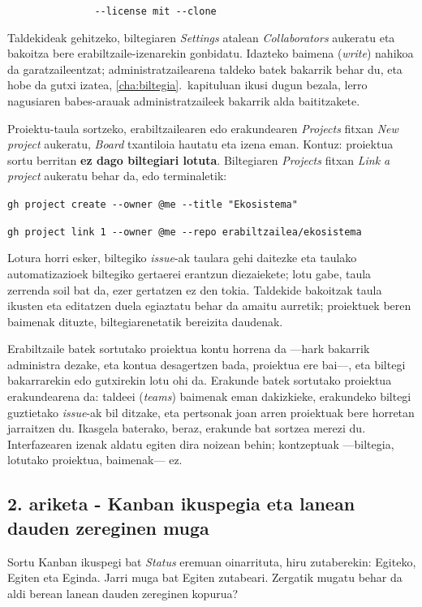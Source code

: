 \verb|               --license mit --clone|

Taldekideak gehitzeko, biltegiaren \textit{Settings} atalean \textit{Collaborators} aukeratu eta bakoitza bere erabiltzaile-izenarekin gonbidatu.
Idazteko baimena (\textit{write}) nahikoa da garatzaileentzat; administratzailearena taldeko batek bakarrik behar du, eta hobe da gutxi izatea, \ref{cha:biltegia}.~kapituluan ikusi dugun bezala, lerro nagusiaren babes-arauak administratzaileek bakarrik alda baititzakete.

Proiektu-taula sortzeko, erabiltzailearen edo erakundearen \textit{Projects} fitxan \textit{New project} aukeratu, \textit{Board} txantiloia hautatu eta izena eman.
Kontuz: proiektua sortu berritan \textbf{ez dago biltegiari lotuta}.
Biltegiaren \textit{Projects} fitxan \textit{Link a project} aukeratu behar da, edo terminaletik:

\verb|gh project create --owner @me --title "Ekosistema"|

\verb|gh project link 1 --owner @me --repo erabiltzailea/ekosistema|

Lotura horri esker, biltegiko \textit{issue}-ak taulara gehi daitezke eta taulako automatizazioek biltegiko gertaerei erantzun diezaiekete; lotu gabe, taula zerrenda soil bat da, ezer gertatzen ez den tokia.
Taldekide bakoitzak taula ikusten eta editatzen duela egiaztatu behar da amaitu aurretik; proiektuek beren baimenak dituzte, biltegiarenetatik bereizita daudenak.

Erabiltzaile batek sortutako proiektua kontu horrena da ---hark bakarrik administra dezake, eta kontua desagertzen bada, proiektua ere bai---, eta biltegi bakarrarekin edo gutxirekin lotu ohi da.
Erakunde batek sortutako proiektua erakundearena da: taldeei (\textit{teams}) baimenak eman dakizkieke, erakundeko biltegi guztietako \textit{issue}-ak bil ditzake, eta pertsonak joan arren proiektuak bere horretan jarraitzen du.
Ikasgela baterako, beraz, erakunde bat sortzea merezi du.
Interfazearen izenak aldatu egiten dira noizean behin; kontzeptuak ---biltegia, lotutako proiektua, baimenak--- ez.

\subsection{2. ariketa - Kanban ikuspegia eta lanean dauden zereginen muga}

Sortu Kanban ikuspegi bat \textit{Status} eremuan oinarrituta, hiru zutaberekin: Egiteko, Egiten eta Eginda.
Jarri muga bat Egiten zutabeari.
Zergatik mugatu behar da aldi berean lanean dauden zereginen kopurua?

